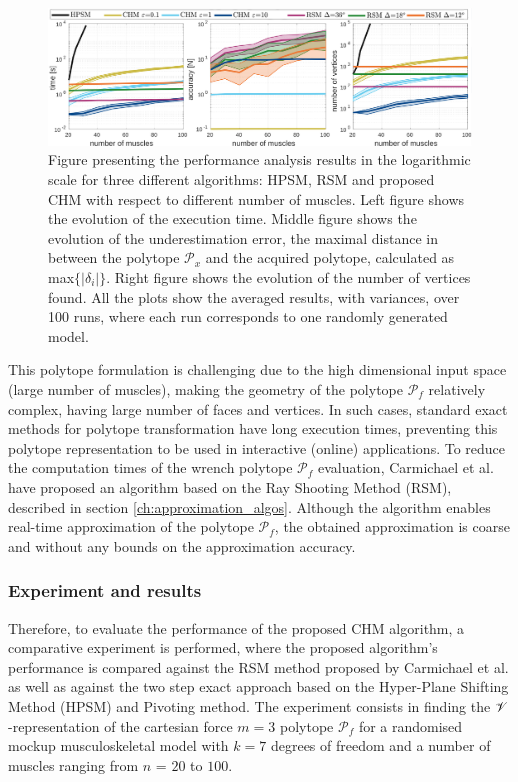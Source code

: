\begin{figure}[!t]
    \centering
    \includegraphics[width=1.\textwidth]{Papers/images/one_auto_new5_these}
    \caption{{Figure presenting the performance analysis results in the logarithmic scale for three different algorithms: HPSM, RSM and proposed CHM with respect to different number of muscles. Left figure shows the evolution of the execution time. Middle figure shows the evolution of the underestimation error, the maximal distance in between the polytope $\mathcal{P}_x$ and the acquired polytope, calculated as max$\{|\delta_{i}|\}$. Right figure shows the evolution of the number of vertices found. All the plots show the averaged results, with variances, over 100 runs, where each run corresponds to one randomly generated model.}}
    \label{fig:performance_results}
\end{figure}
This polytope formulation is challenging due to the high dimensional input space (large number of muscles), making the geometry of the polytope $\mathcal{P}_f$ relatively complex, having large number of faces and vertices. In such cases, standard exact methods for polytope transformation have long execution times, preventing this polytope representation to be used in interactive (online) applications. To reduce the computation times of the wrench polytope $\mathcal{P}_f$ evaluation, Carmichael et al. \cite{carmichael_towards_2011} have proposed an algorithm based on the Ray Shooting Method (RSM), described in section \ref{ch:approximation_algos}. Although the algorithm enables real-time approximation of the polytope $\mathcal{P}_f$, the obtained approximation is coarse and without any bounds on the approximation accuracy. 


\subsubsection{Experiment and results}
Therefore, to evaluate the performance of the proposed CHM algorithm, a comparative experiment is
performed, where the proposed algorithm's performance is compared against the RSM method proposed by Carmichael et al.\cite{carmichael_towards_2011} as well as against the two step exact approach based on the Hyper-Plane Shifting Method (HPSM)\cite{hyper_psm} and Pivoting method\cite{bremner_fukuda_marzetta_1998}. The experiment consists in finding the $\mathscr{V}$-representation of the cartesian force $m=3$ polytope $\mathcal{P}_f$ for a randomised mockup musculoskeletal model with $k\!=\!7$ degrees of freedom and a number of muscles ranging from $n$ = $20$ to $100$. 

